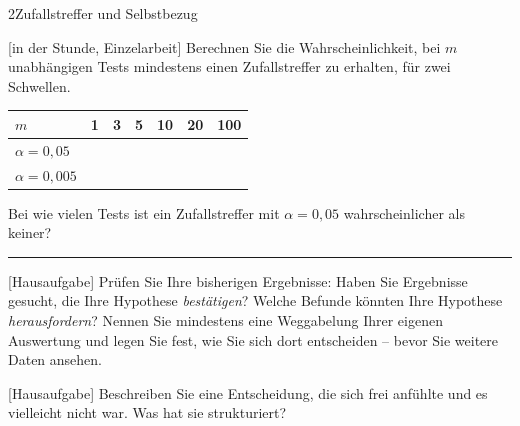 \begin{uebungsblattb}{2}{Zufallstreffer und Selbstbezug}

[in der Stunde, Einzelarbeit]
Berechnen Sie die Wahrscheinlichkeit, bei $m$ unabhängigen Tests
mindestens einen Zufallstreffer zu erhalten, für zwei Schwellen.

\begin{center}
\renewcommand{\arraystretch}{1.6}
\begin{tabular}{|l|c|c|c|c|c|c|}
\hline
$m$ & 1 & 3 & 5 & 10 & 20 & 100 \\ \hline
$\alpha=0{,}05$ & & & & & & \\ \hline
$\alpha=0{,}005$ & & & & & & \\ \hline
\end{tabular}
\end{center}
Bei wie vielen Tests ist ein Zufallstreffer mit $\alpha=0{,}05$
wahrscheinlicher als keiner? \rule{25mm}{0.3pt}

[Hausaufgabe]
Prüfen Sie Ihre bisherigen Ergebnisse: Haben Sie Ergebnisse gesucht, die
Ihre Hypothese \emph{bestätigen}? Welche Befunde könnten Ihre Hypothese
\emph{herausfordern}? Nennen Sie mindestens eine Weggabelung Ihrer
eigenen Auswertung und legen Sie fest, wie Sie sich dort entscheiden --
bevor Sie weitere Daten ansehen.

[Hausaufgabe]
Beschreiben Sie eine Entscheidung, die sich frei anfühlte und es
vielleicht nicht war. Was hat sie strukturiert?


\end{uebungsblattb}
